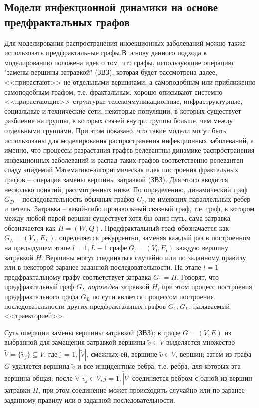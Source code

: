 \subsection{Модели инфекционной динамики на основе предфрактальных графов}

Для моделирования распространения инфекционных заболеваний можно также использовать предфрактальные графы.В основу данного подхода к моделированию положена идея о том, что графы, использующие операцию "замены вершины затравкой" (ЗВЗ), которая будет рассмотрена далее, <<прирастают>> не отдельными вершинами, а самоподобным или приближенно самоподобным  графом, т.е. фрактальным, хорошо описывают   системно <<прирастающие>> структуры: телекоммуникационные, инфраструктурные, социальные и технические сети, некоторые популяции, в которых существует разбиение на группы, в которых связей внутри группы больше, чем между отдельными группами. При этом показано,  что такие модели могут быть использованы для моделирования распространения инфекционных заболеваний, а именно, что процессы разрастания  графов релевантны динамике распространения инфекционных  заболеваний  и распад таких графов соответственно релевантен  спаду эпидемий %
\cite{Utakaeva_disser:2011}
Математико-алгоритмическая  идея построения фрактальных графов -- операция замены вершины затравкой (ЗВЗ). Для этого вводится несколько понятий, рассмотренных ниже.
По определению, динамический граф ${G_D}$ -- последовательность обычных графов $G_l$, не имеющих параллельных ребер и петель. Затравка -- какой-либо произвольный связный граф, т.е. граф, в котором между любой парой вершин существует хотя бы один путь, сама затравка обозначается как  ${H=(W,Q)}$. Предфрактальный граф обозначается как $G_L=(V_L,E_L)$, определяется рекуррентно, заменяя каждый раз в построенном на предыдущем этапе $l = \overline{1, L-1}$ графе $G_l=(V_l,E_l)$ каждую вершину затравкой $H$. Вершины могут соединяться случайно или по заданному правилу или в некоторой заранее заданной последовательности. На этапе $l=1$ предфрактальному графу соответствует затравка $G_1=H$. Говорят, что предфрактальный граф $G_L$  \textit{порожден} затравкой $H$, при этом процесс построения предфрактального графа $G_L$  по сути является процессом построения последовательности других предфрактальных графов $\overline{G_1,G_L}$, называемый <<траекторией>>. 

Суть операции замены вершины затравкой (ЗВЗ): в графе $G=(V, E)$ из выбранной для замещения затравкой вершины $\tilde{v}  \in V $ выделяется множество $\tilde{V} = \{\tilde{v}_j\} \subseteq V$, где j = $\overline{1,|\tilde{V}|}$, смежных ей, вершине $\tilde{v}  \in V $, вершин; затем из графа $G$ удаляется вершина $\tilde{v}$ и все инцидентные ребра, т.е. ребра, для которых эта вершина общая; после $\forall$ $\tilde{v}_j \in \tilde{V}, j=\overline{1,|\tilde{V}|}$ соединяется ребром с одной из вершин затравки $H$, при этом соединение может происходить случайно или по заранее заданному правилу или в заданной последовательности.

